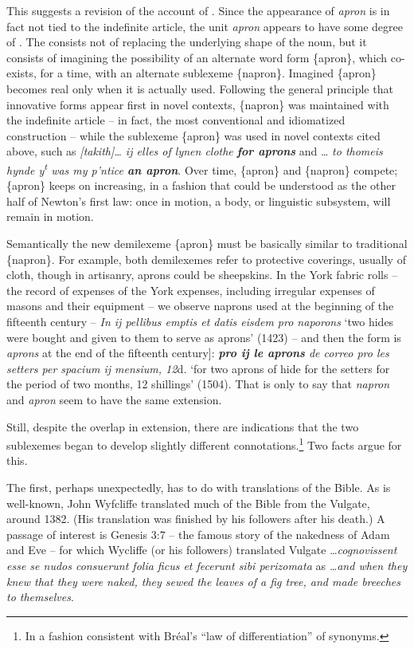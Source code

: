 \documentclass[output=paper,
modfonts
]{LSP/langsci}
\begin{document}
This suggests a revision of the account of . Since the
appearance of \emph{apron} is in fact not tied to the indefinite
article, the unit \emph{apron} appears to have some degree of .
The  consists not of replacing the underlying shape of the
noun, but it consists of imagining the possibility of an alternate word
form \{apron\}, which co-exists, for a time, with an alternate sublexeme
\{napron\}. Imagined \{apron\} becomes real only when it is actually
used. Following the general principle that innovative forms appear first
in novel contexts, \{napron\} was maintained with the indefinite
article -- in fact, the most conventional and idiomatized
construction -- while the sublexeme \{apron\} was used in novel contexts
cited above, such as \emph{{[}takith{]}\ldots{} ij elles of lynen
clothe} \emph{\textbf{for aprons}} and \ldots{} \emph{to thomeis hynde
y\textsuperscript{t} was my p'ntice \textbf{an apron}}. Over time,
\{apron\} and \{napron\} compete; \{apron\} keeps on increasing, in a
fashion that could be understood as the other half of Newton's first
law: once in motion, a body, or linguistic subsystem, will remain in
motion.

Semantically the new demilexeme \{apron\} must be basically similar to
traditional \{napron\}. For example, both demilexemes refer to
protective coverings, usually of cloth, though in artisanry, aprons
could be sheepskins. In the York fabric rolls -- the record of expenses
of the York expenses, including irregular expenses of masons and their
equipment -- we observe naprons used at the beginning of the fifteenth
century -- \emph{In ij pellibus emptis et datis eisdem pro naporons} `two
hides were bought and given to them to serve as aprons' (1423) -- and
then the form is \emph{aprons} at the end of the fifteenth century{]}:
\emph{\textbf{pro ij le aprons} de correo pro les setters per spacium ij
mensium, 12}d\emph{.} `for two aprons of hide for the setters for the
period of two months, 12 shillings' (1504). That is only to say that
\emph{napron} and \emph{apron} seem to have the same extension.

Still, despite the overlap in extension, there are indications that the
two sublexemes began to develop slightly different
connotations.\footnote{In a fashion consistent with Bréal's \citeyearpar[ch. 2]{breal1900} ``law of differentiation'' of synonyms.} Two facts argue for this.

The first, perhaps unexpectedly, has to do with translations of the
Bible. As is well-known, John Wyfcliffe translated much of the Bible
from the Vulgate, around 1382. (His translation was finished by his
followers after his death.) A passage of interest is Genesis 3:7 -- the
famous story of the nakedness of Adam and Eve -- for which Wycliffe (or
his followers) translated Vulgate \ldots{}\emph{cognovissent esse se
nudos consuerunt folia ficus et fecerunt sibi perizomata} as
\emph{\ldots{}and when they knew that they were naked, they sewed the
leaves of a fig tree, and made breeches to themselves}.
\end{document}
